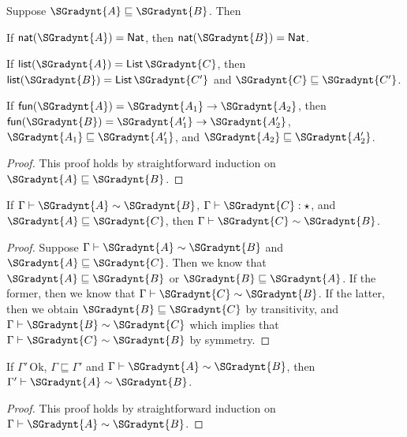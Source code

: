 \begin{lemma}
  \label{lemma:fun_type_pre}
  Suppose $ \SGradynt{A}  \sqsubseteq  \SGradynt{B} $.  Then
  \begin{enumR}
  \item If $ \mathsf{nat}( \SGradynt{A} ) =   \mathsf{Nat}  $, then $ \mathsf{nat}( \SGradynt{B} ) =   \mathsf{Nat}  $.    
  \item If $ \mathsf{list}( \SGradynt{A} ) =   \mathsf{List}\, \SGradynt{C}  $, then $ \mathsf{list}( \SGradynt{B} ) =   \mathsf{List}\, \SGradynt{C'}  $ and $ \SGradynt{C}  \sqsubseteq  \SGradynt{C'} $.
  \item If $ \mathsf{fun}( \SGradynt{A} ) =  \SGradynt{A_{{\mathrm{1}}}}  \rightarrow  \SGradynt{A_{{\mathrm{2}}}} $, then $ \mathsf{fun}( \SGradynt{B} ) =  \SGradynt{A'_{{\mathrm{1}}}}  \rightarrow  \SGradynt{A'_{{\mathrm{2}}}} $, $ \SGradynt{A_{{\mathrm{1}}}}  \sqsubseteq  \SGradynt{A'_{{\mathrm{1}}}} $, and $ \SGradynt{A_{{\mathrm{2}}}}  \sqsubseteq  \SGradynt{A'_{{\mathrm{2}}}} $.
  \end{enumR}
\end{lemma}
\begin{proof}
  This proof holds by straightforward induction on $ \SGradynt{A}  \sqsubseteq  \SGradynt{B} $.
\end{proof}

\begin{lemma}
  \label{lemma:type_cons_type_pre_2}
  If $ \Gamma  \vdash  \SGradynt{A}  \sim  \SGradynt{B} $, $ \Gamma  \vdash  \SGradynt{C}  : \star $, and $ \SGradynt{A}  \sqsubseteq  \SGradynt{C} $, then $ \Gamma  \vdash  \SGradynt{C}  \sim  \SGradynt{B} $.
\end{lemma}
\begin{proof}
  Suppose $ \Gamma  \vdash  \SGradynt{A}  \sim  \SGradynt{B} $ and $ \SGradynt{A}  \sqsubseteq  \SGradynt{C} $.  Then we know
  that $ \SGradynt{A}  \sqsubseteq  \SGradynt{B} $ or $ \SGradynt{B}  \sqsubseteq  \SGradynt{A} $.  If the former, then
  we know that $ \Gamma  \vdash  \SGradynt{C}  \sim  \SGradynt{B} $.  If the latter, then
  we obtain $ \SGradynt{B}  \sqsubseteq  \SGradynt{C} $ by transitivity, and $ \Gamma  \vdash  \SGradynt{B}  \sim  \SGradynt{C} $
  which implies that $ \Gamma  \vdash  \SGradynt{C}  \sim  \SGradynt{B} $ by symmetry.
\end{proof}

\begin{lemma}
  \label{lemma:type_cons_ctx_pre}
  If $ \Gamma' \,\text{Ok} $, $ \Gamma  \sqsubseteq  \Gamma' $ and $ \Gamma  \vdash  \SGradynt{A}  \sim  \SGradynt{B} $, then $ \Gamma'  \vdash  \SGradynt{A}  \sim  \SGradynt{B} $.
\end{lemma}
\begin{proof}
  This proof holds by straightforward induction on $ \Gamma  \vdash  \SGradynt{A}  \sim  \SGradynt{B} $. 
\end{proof}

